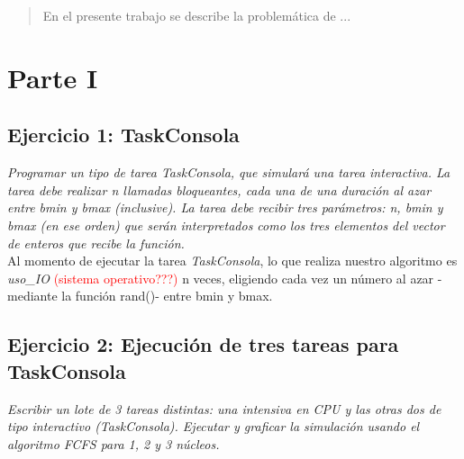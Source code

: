 \documentclass[a4paper]{article}
\begin{document}
\thispagestyle{empty}

\maketitle
\newpage

\thispagestyle{empty}
\vfill
\begin{abstract}
En el presente trabajo se describe la problemática de ...
\end{abstract}


\thispagestyle{empty}
\vspace{3cm}
\tableofcontents
\newpage


\newpage
\section{Parte I}

\subsection{Ejercicio 1: TaskConsola}
\textit{Programar un tipo de tarea TaskConsola, que simular\'a una tarea interactiva. La tarea debe realizar n llamadas bloqueantes, cada una de una duraci\'on al azar entre bmin y bmax (inclusive). La tarea debe recibir tres par\'ametros: n, bmin y bmax (en ese orden) que ser\'an interpretados como los tres elementos del vector de enteros que recibe la funci\'on.}\\

Al momento de ejecutar la tarea \emph{TaskConsola}, lo que realiza nuestro algoritmo es \emph{uso_IO} \textcolor{red}{(sistema operativo???)} n veces, eligiendo cada vez un n\'umero al azar -mediante la funci\'on rand()- entre bmin y bmax.



\subsection{Ejercicio 2: Ejecuci\'on de tres tareas para TaskConsola}\label{ej2}
\textit{Escribir un lote de 3 tareas distintas: una intensiva en CPU y las otras dos de tipo interactivo (TaskConsola). Ejecutar y graficar la simulaci\'on usando el algoritmo FCFS para 1, 2 y 3 n\'ucleos.}\\
\end{document}
